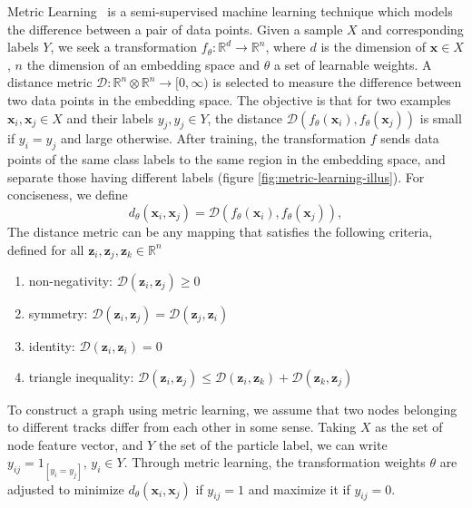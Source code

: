 Metric Learning~\cite{metric-learning-rev1, metric-learning-rev2, metric-learning-rev3} is a semi-supervised machine learning technique which models the difference between a pair of data points. 
Given a sample  $X$ and corresponding labels $Y$, we seek a transformation $f_{\theta}: \mathbb{R}^d\rightarrow \mathbb{R}^n$, where $d$ is the dimension of $\mathbf{x}\in X$, $n$ the dimension of an embedding space and $\theta$ a set of learnable weights. 
A distance metric $\mathcal{D}: \mathbb{R}^n \otimes \mathbb{R}^n \rightarrow [0, \infty)$ is selected to measure the difference between two data points in the embedding space. 
The objective is that for two examples $\mathbf{x}_i, \mathbf{x}_j \in X$ and their labels $y_j, y_j\in Y$, the distance $ \mathcal{D}(f_{\theta}(\mathbf{x}_i), f_{\theta}(\mathbf{x}_j))$ is small if $y_i=y_j$ and large otherwise. 
After training, the transformation $f$ sends data points of the same class labels to the same region in the embedding space, and separate those having different labels (figure \ref{fig:metric-learning-illus}).
For conciseness, we define
\begin{equation}
\label{eq:9.4}
d_{\theta}(\mathbf{x}_i, \mathbf{x}_j) = \mathcal{D}(f_{\theta}(\mathbf{x}_i), f_{\theta}(\mathbf{x}_j)), 
\end{equation} 
The distance metric can be any mapping that satisfies the following criteria, defined for all $\mathbf{z}_i, \mathbf{z}_j, \mathbf{z}_k \in \mathbb{R}^n $
\begin{enumerate}
    \item non-negativity: $\mathcal{D}(\mathbf{z}_i, \mathbf{z}_j) \ge 0 $
    \item symmetry: $\mathcal{D}(\mathbf{z}_i, \mathbf{z}_j) = \mathcal{D}(\mathbf{z}_j, \mathbf{z}_i)$ 
    \item identity: $\mathcal{D}(\mathbf{z}_i, \mathbf{z}_i) = 0$
    \item triangle inequality: $\mathcal{D}(\mathbf{z}_i, \mathbf{z}_j) \le \mathcal{D}(\mathbf{z}_i, \mathbf{z}_k) + \mathcal{D}(\mathbf{z}_k, \mathbf{z}_j)$
\end{enumerate}

To construct a graph using metric learning, we assume that two nodes belonging to different tracks differ from each other in some sense. 
Taking $X$ as the set of node feature vector, and $Y$ the set of the particle label, we can write $y_{ij} = 1_{[y_i=y_j]},\, y_i\in Y$.
Through metric learning, the transformation weights $\theta$ are adjusted to minimize $d_{\theta}(\mathbf{x}_i, \mathbf{x}_j)$ if $y_{ij}=1$ and maximize it if $y_{ij}=0$.

